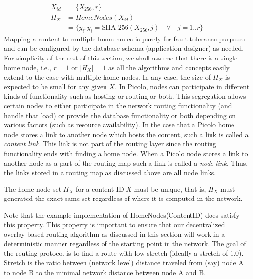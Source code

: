 \begin{align}
    X_{id} &= \{X_{256}, r\} \\
    H_X &= HomeNodes(X_{id}) \\
        &= \{ y_i : y_i = \textrm{SHA-256}(X_{256}, j) \quad \forall \quad j = 1 .. r\}
\end{align}
Mapping a content to multiple home nodes is purely for fault tolerance purposes and can be configured by the database
schema (application designer) as needed. For simplicity of the rest of this section, we shall assume that there is a
single home node, i.e., \( r = 1\) or \( |H_X| = 1\) as all the algorithms and concepts easily extend to the case with
multiple home nodes.  In any case, the size of \( H_X \) is expected to be small for any given \(X\).
\newline\newline
In \textsf{Picolo}, nodes can participate in different kinds of functionality such as hosting or routing or both. This
segregation allows certain nodes to either participate in the network routing functionality (and handle that load) or
provide the database functionality or both depending on various factors (such as resource availability). In the case
that a \textsf{Picolo} home node stores a link to another node which hosts the content, such a link is called a {\em content
link}. This link is not part of the routing layer since the routing functionality ends with finding a home node. When a
\textsf{Picolo} node stores a link to another node as a part of the routing map such a link is called a {\em node link}. Thus,
the links stored in a routing map as discussed above are all node links.
\begin{property} The home node set \(H_X\) for a content ID \(X\) must be unique, that is,
    \(H_X\) must generated the exact same set regardless of where it is computed in the network.
\label{property_unique_home}
\end{property}
Note that the example implementation of \textsf{HomeNodes(ContentID)} does satisfy this property. This property is important
to ensure that our decentralized overlay-based routing algorithm as discussed in this section will work in a
deterministic manner regardless of the starting point in the network.
\newline\newline
The goal of the routing protocol is to find a route with low stretch (ideally a stretch of 1.0). Stretch is the ratio
between (network level) distance traveled from (say) node A to node B to the minimal network distance between node A and B.
